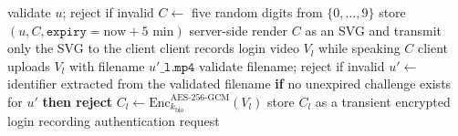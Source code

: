 \documentclass[runningheads]{llncs}
\begin{document}
{\begin{algorithm}[!tbp]
\begin{algorithmic}[1]
\State validate $u$; reject if invalid
\State $C\gets$ five random digits from $\{0,\ldots,9\}$
\State store $(u,C,\texttt{expiry}=\mathrm{now}+5\text{ min})$ server-side
\State render $C$ as an SVG and transmit only the SVG to the client
\State client records login video $V_l$ while speaking $C$
\State client uploads $V_l$ with filename $u'\texttt{\_l.mp4}$
\State validate filename; reject if invalid
\State $u'\gets$ identifier extracted from the validated filename
\State \textbf{if} no unexpired challenge exists for $u'$ \textbf{then reject}
\State $C_l\gets\mathrm{Enc}^{\mathrm{AES\text{-}256\text{-}GCM}}_{k_{\mathrm{bio}}}(V_l)$
\State store $C_l$ as a transient encrypted login recording
\State \Return authentication request
\end{algorithmic}
\end{algorithm}





}
\fi


\end{document}

